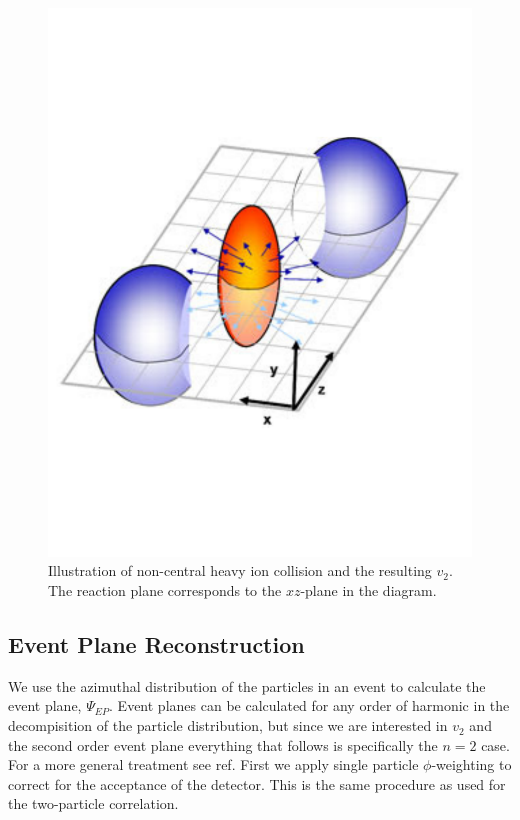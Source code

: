 \begin{figure}[htbp]
\begin{center}
\includegraphics[scale=.4]{Plots/Correlations/v2_cartoon_2.pdf}
\end{center}
\caption[$v_2$ and Event Plane Diagram]{Illustration of non-central heavy ion collision and the resulting $v_2$. The reaction plane corresponds to the $xz$-plane in the diagram.}
\label{fig:EPcartoon}
\end{figure}

\subsection{Event Plane Reconstruction}

We use the azimuthal distribution of the particles in an event to calculate the event plane, $\Psi_{EP}$. Event planes can be calculated for any order of harmonic in the decompisition of the particle distribution, but since we are interested in $v_2$ and the second order event plane everything that follows is specifically the $n = 2$ case. For a more general treatment see ref. First we apply single particle $\phi$-weighting to correct for the acceptance of the detector. This is the same procedure as used for the two-particle correlation.

